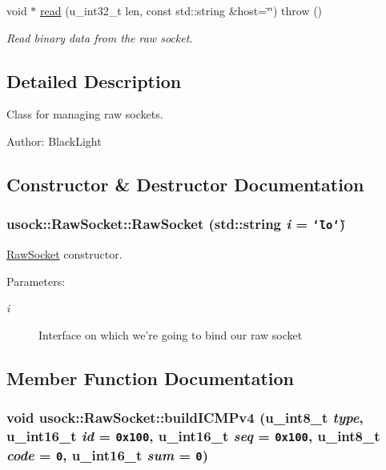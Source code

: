 \begin{CompactItemize}
void $\ast$ \hyperlink{classusock_1_1RawSocket_bc4cd4449b47d28397fc270447405609}{read} (u\_\-int32\_\-t len, const std::string \&host=\char`\"{}\char`\"{})  throw ()
\begin{CompactList}\small\item\em Read binary data from the raw socket. \item\end{CompactList}\end{CompactItemize}


\subsection{Detailed Description}
Class for managing raw sockets. 

\begin{Desc}
\item[Author:]BlackLight \end{Desc}


\subsection{Constructor \& Destructor Documentation}
\hypertarget{classusock_1_1RawSocket_d476598f4a6db6d3cf28673172eb1b8b}{
\subsubsection[{RawSocket}]{\setlength{\rightskip}{0pt plus 5cm}usock::RawSocket::RawSocket (std::string {\em i} = {\tt \char`\"{}lo\char`\"{}})}}
\label{classusock_1_1RawSocket_d476598f4a6db6d3cf28673172eb1b8b}


\hyperlink{classusock_1_1RawSocket}{RawSocket} constructor. 

\begin{Desc}
\item[Parameters:]
\begin{description}
\item[{\em i}]Interface on which we're going to bind our raw socket \end{description}
\end{Desc}


\subsection{Member Function Documentation}
\hypertarget{classusock_1_1RawSocket_bf253d275f07db49c00f4b0d8fcf0947}{
\subsubsection[{buildICMPv4}]{\setlength{\rightskip}{0pt plus 5cm}void usock::RawSocket::buildICMPv4 (u\_\-int8\_\-t {\em type}, \/  u\_\-int16\_\-t {\em id} = {\tt 0x100}, \/  u\_\-int16\_\-t {\em seq} = {\tt 0x100}, \/  u\_\-int8\_\-t {\em code} = {\tt 0}, \/  u\_\-int16\_\-t {\em sum} = {\tt 0})}}
\label{classusock_1_1RawSocket_bf253d275f07db49c00f4b0d8fcf0947}


